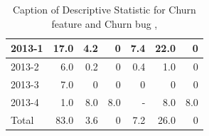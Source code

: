 \documentclass[UKenglish]{ifimaster}  %
\begin{document}
\begin{table}[!htbp]
\begin{adjustwidth}{-2.5cm}{}
{{\begin{tabular}{ | l | r | r | r | r | r | r | }
2013-1 & 17.0 & 4.2 & 0 & 7.4 & 22.0 & 0\\ \hline
2013-2 & 6.0 & 0.2 & 0 & 0.4 & 1.0 & 0\\ \hline
2013-3 & 7.0 & 0 & 0 & 0 & 0 & 0\\ \hline
2013-4 & 1.0 & 8.0 & 8.0 & - & 8.0 & 8.0\\ \hline
Total & 83.0 & 3.6 & 0 & 7.2 & 26.0 & 0\\ \hline
\end{tabular}
}
}
\end{adjustwidth}
\caption[Optional caption for list of figures]{Caption of Descriptive Statistic for Churn feature and Churn bug  , }
\label{DS:8:4} %
\end{table}



\end{document}
